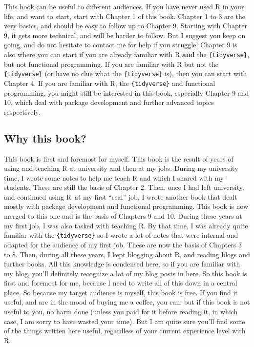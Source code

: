 \documentclass[]{gitbook}
\begin{document}
This book can be useful to different audiences. If you have never used R in your life, and want
to start, start with Chapter 1 of this book. Chapter 1 to 3 are the very basics, and should be
easy to follow up to Chapter 9.
Starting with Chapter 9, it gets more technical, and will be harder to follow. But I suggest
you keep on going, and do not hesitate to contact me for help if you struggle! Chapter 9
is also where you can start if you are already familiar with R \textbf{and} the \texttt{\{tidyverse\}}, but not
functional programming. If you are familiar with R but not the \texttt{\{tidyverse\}} (or have no clue
what the \texttt{\{tidyverse\}} is), then you can start with Chapter 4. If you are familiar with R, the
\texttt{\{tidyverse\}} and functional programming, you might still be interested in this book, especially
Chapter 9 and 10, which deal with package development and further advanced topics respectively.

\hypertarget{why-this-book}{%
\subsection*{Why this book?}\label{why-this-book}}

This book is first and foremost for myself. This book is the result of years of using and teaching
R at university and then at my jobs. During my university time, I wrote some notes to help me
teach R and which I shared with my students. These are still the basis of Chapter 2. Then, once
I had left university, and continued using R~at my first ``real'' job, I wrote another book that
dealt mostly with package development and functional programming. This book is now merged to this
one and is the basis of Chapters 9 and 10. During these years at my first
job, I was also tasked with teaching R. By that time, I was already quite familiar with the
\texttt{\{tidyverse\}} so I wrote a lot of notes that were internal and adapted for the audience of my
first job. These are now the basis of Chapters 3 to 8.
Then, during all these years, I kept blogging about R, and reading blogs and further books. All
this knowledge is condensed here, so if you are familiar with my blog, you'll definitely recognize
a lot of my blog posts in here. So this book is first and foremost for me, because I need to write
all of this down in a central place. So because my target audience is myself, this book is free. If
you find it useful, and are in the mood of buying me a coffee, you can, but if this book is not
useful to you, no harm done (unless you paid for it before reading it, in which case, I am sorry
to have wasted your time). But I am quite sure you'll find some of the things written here useful,
regardless of your current experience level with R.
\end{document}
